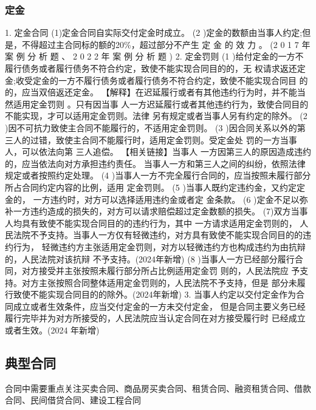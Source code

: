 \documentclass[UTF8,12pt]{ctexart}
\numberwithin{equation}{section} %
\numberwithin{figure}{section}
\numberwithin{table}{section}
\begin{document}
	\subsubsection{定金}
	1. 定金合同
	(1)定金合同自实际交付定金时成立。
	(2 )定金的数额由当事人约定;但是，不得超过主合同标的额的20\%，超过部分不产生 定 金 的 效 力 。 (2 0 1 7 年 案 例 分 析 题 、 2 0 2 2 年 案 例 分 析 题 )
	2. 定金罚则
	(1 )给付定金的一方不履行债务或者履行债务不符合约定，致使不能实现合同目的的，无 权请求返还定金;收受定金的一方不履行债务或者履行债务不符合约定，致使不能实现合同目 的的，应当双倍返还定金。
	【解释】在迟延履行或者有其他违约行为时，并不能当然适用定金罚则 。只有因当事 人一方迟延履行或者其他违约行为，致使合同目的不能实现，才可以适用定金罚则。法律 另有规定或者当事人另有约定的除外。
	(2 )因不可抗力致使主合同不能履行的，不适用定金罚则。
	(3 )因合同关系以外的第 三人的过错，致使主合同不能履行时，适用定金罚则。受定金处 罚的一方当事人，可以依法向第 三人追偿。
	【相关链接】当事人 一方因第三人的原因造成违约的，应当依法向对方承担违约责任。 当事人一方和第三人之间的纠纷，依照法律规定或者按照约定处理。
	(4 )当事人一方不完全履行合同的，应当按照未履行部分所占合同约定内容的比例，适用 定金罚则。
	(5 )当事人既约定违约金，又约定定金的， 一方违约时，对方可以选择适用违约金或者定 金条款。
	(6 )定金不足以弥补一方违约造成的损失的，对方可以请求赔偿超过定金数额的损失。
	(7)双方当事人均具有致使不能实现合同目的的违约行为，其中 一方请求适用定金罚则的， 人民法院不予支持。当事人一方仅有轻微违约，对方具有致使不能实现合同目的的违约行为， 轻微违约方主张适用定金罚则，对方以轻微违约方也构成违约为由抗辩的，人民法院对该抗辩
	不予支持。(2024年新增)
	(8 )当事人一方已经部分履行合同，对方接受并主张按照未履行部分所占比例适用定金罚
	则的，人民法院应 予支持。对方主张按照合同整体适用定金罚则的，人民法院不予支持，但是 部分未履行致使不能实现合同目的的除外。(2024年新增)
	3. 当事人约定以交付定金作为合同成立或者生效条件，应当交付定金的一方未交付定金， 但是合同主要义务已经履行完毕并为对方所接受的，人民法院应当认定合同在对方接受履行时 已经成立或者生效。(2024 年新增)
	
	\subsection{典型合同}
	合同中需要重点关注买卖合同、商品房买卖合同、租赁合同、融资租赁合同、借款合同、民间借贷合同、建设工程合同
	
\end{document}
